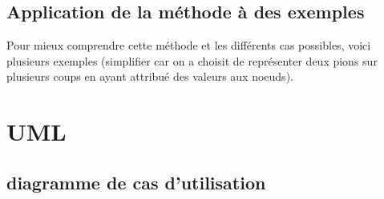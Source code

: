 \documentclass[12,french]{report}
\begin{document}
%
%
%
%
%


\section{Application de la méthode à des exemples}

Pour mieux comprendre cette méthode et les différents cas possibles,
voici plusieurs exemples (simplifier car on a choisit de représenter
deux pions sur plusieurs coups en ayant attribué des valeurs aux noeuds).

\chapter{UML}

\section{diagramme de cas d'utilisation}
\end{document}
